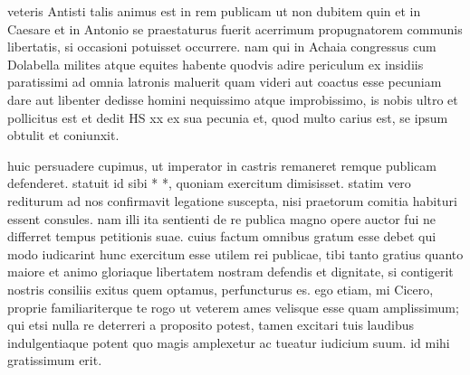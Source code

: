 


 veteris Antisti talis animus est in rem publicam ut non dubitem quin et in Caesare et in Antonio se praestaturus fuerit acerrimum propugnatorem communis libertatis, si occasioni potuisset occurrere. nam qui in Achaia congressus cum Dolabella milites atque equites habente quodvis adire periculum ex insidiis paratissimi ad omnia latronis maluerit quam videri aut coactus esse pecuniam dare aut libenter dedisse homini nequissimo atque improbissimo, is nobis ultro et pollicitus est et dedit HS xx ex sua pecunia et, quod multo carius est, se ipsum obtulit et coniunxit.

 huic persuadere cupimus, ut imperator in castris remaneret remque publicam defenderet. statuit id sibi * *, quoniam exercitum dimisisset. statim vero rediturum ad nos confirmavit legatione suscepta, nisi praetorum comitia habituri essent consules. nam illi ita sentienti de re publica magno opere auctor fui ne differret tempus petitionis suae. cuius factum omnibus gratum esse debet qui modo iudicarint hunc exercitum esse utilem rei publicae, tibi tanto gratius quanto maiore et animo gloriaque libertatem nostram defendis et dignitate, si contigerit nostris consiliis exitus quem optamus, perfuncturus es. ego etiam, mi Cicero, proprie familiariterque te rogo ut veterem ames velisque esse quam amplissimum; qui etsi nulla re deterreri a proposito potest, tamen excitari tuis laudibus indulgentiaque potent quo magis amplexetur ac tueatur iudicium suum. id mihi gratissimum erit.
